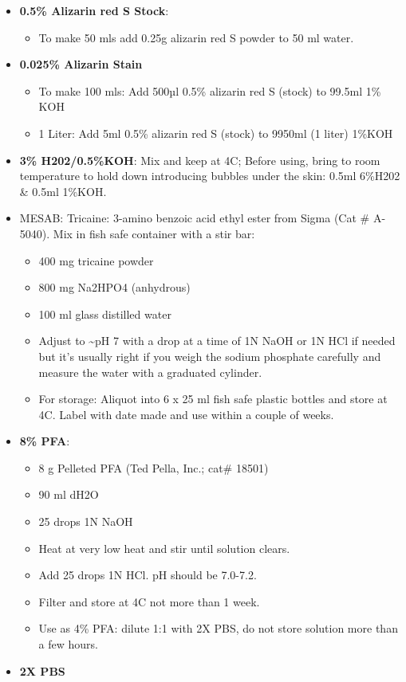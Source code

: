 \documentclass[
  letterpaper,
  DIV=11,
  numbers=noendperiod]{scrreprt}
\providecommand{\tightlist}{%
  \setlength{\itemsep}{0pt}\setlength{\parskip}{0pt}}\usepackage{longtable,booktabs,array}
\begin{document}
\begin{itemize}
\tightlist
\item
  \textbf{0.5\% Alizarin red S Stock}:

  \begin{itemize}
  \tightlist
  \item
    To make 50 mls add 0.25g alizarin red S powder to 50 ml water.
  \end{itemize}
\item
  \textbf{0.025\% Alizarin Stain}

  \begin{itemize}
  \tightlist
  \item
    To make 100 mls: Add 500µl 0.5\% alizarin red S (stock) to 99.5ml
    1\% KOH
  \item
    1 Liter: Add 5ml 0.5\% alizarin red S (stock) to 9950ml (1 liter)
    1\%KOH
  \end{itemize}
\item
  \textbf{3\% H202/0.5\%KOH}: Mix and keep at 4C; Before using, bring to
  room temperature to hold down introducing bubbles under the skin:
  0.5ml 6\%H202 \& 0.5ml 1\%KOH.
\item
  MESAB: Tricaine: 3-amino benzoic acid ethyl ester from Sigma (Cat \#
  A-5040). Mix in fish safe container with a stir bar:

  \begin{itemize}
  \tightlist
  \item
    400 mg tricaine powder
  \item
    800 mg Na2HPO4 (anhydrous)
  \item
    100 ml glass distilled water
  \item
    Adjust to \textasciitilde pH 7 with a drop at a time of 1N NaOH or
    1N HCl if needed but it's usually right if you weigh the sodium
    phosphate carefully and measure the water with a graduated cylinder.
  \item
    For storage: Aliquot into 6 x 25 ml fish safe plastic bottles and
    store at 4C. Label with date made and use within a couple of weeks.
  \end{itemize}
\item
  \textbf{8\% PFA}:

  \begin{itemize}
  \tightlist
  \item
    8 g Pelleted PFA (Ted Pella, Inc.; cat\# 18501)
  \item
    90 ml dH2O
  \item
    25 drops 1N NaOH
  \item
    Heat at very low heat and stir until solution clears.
  \item
    Add 25 drops 1N HCl. pH should be 7.0-7.2.
  \item
    Filter and store at 4C not more than 1 week.
  \item
    Use as 4\% PFA: dilute 1:1 with 2X PBS, do not store solution more
    than a few hours.
  \end{itemize}
\item
  \textbf{2X PBS}


\end{itemize}
\end{document}
